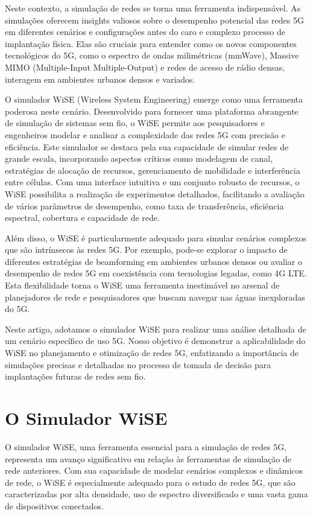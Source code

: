\documentclass[journal]{IEEEtran}
\begin{document}
Neste contexto, a simulação de redes se torna uma ferramenta indispensável. As simulações oferecem insights valiosos sobre o desempenho potencial das redes 5G em diferentes cenários e configurações antes do caro e complexo processo de implantação física. Elas são cruciais para entender como os novos componentes tecnológicos do 5G, como o espectro de ondas milimétricas (mmWave), Massive MIMO (Multiple-Input Multiple-Output) e redes de acesso de rádio densas, interagem em ambientes urbanos densos e variados.

O simulador WiSE (Wireless System Engineering) emerge como uma ferramenta poderosa neste cenário. Desenvolvido para fornecer uma plataforma abrangente de simulação de sistemas sem fio, o WiSE permite aos pesquisadores e engenheiros modelar e analisar a complexidade das redes 5G com precisão e eficiência. Este simulador se destaca pela sua capacidade de simular redes de grande escala, incorporando aspectos críticos como modelagem de canal, estratégias de alocação de recursos, gerenciamento de mobilidade e interferência entre células. Com uma interface intuitiva e um conjunto robusto de recursos, o WiSE possibilita a realização de experimentos detalhados, facilitando a avaliação de vários parâmetros de desempenho, como taxa de transferência, eficiência espectral, cobertura e capacidade de rede.

Além disso, o WiSE é particularmente adequado para simular cenários complexos que são intrínsecos às redes 5G. Por exemplo, pode-se explorar o impacto de diferentes estratégias de beamforming em ambientes urbanos densos ou avaliar o desempenho de redes 5G em coexistência com tecnologias legadas, como 4G LTE. Esta flexibilidade torna o WiSE uma ferramenta inestimável no arsenal de planejadores de rede e pesquisadores que buscam navegar nas águas inexploradas do 5G.

Neste artigo, adotamos o simulador WiSE para realizar uma análise detalhada de um cenário específico de uso 5G. Nosso objetivo é demonstrar a aplicabilidade do WiSE no planejamento e otimização de redes 5G, enfatizando a importância de simulações precisas e detalhadas no processo de tomada de decisão para implantações futuras de redes sem fio.

\section{O Simulador WiSE}

O simulador WiSE, uma ferramenta essencial para a simulação de redes 5G, representa um avanço significativo em relação às ferramentas de simulação de rede anteriores. Com sua capacidade de modelar cenários complexos e dinâmicos de rede, o WiSE é especialmente adequado para o estudo de redes 5G, que são caracterizadas por alta densidade, uso de espectro diversificado e uma vasta gama de dispositivos conectados.
\end{document}

